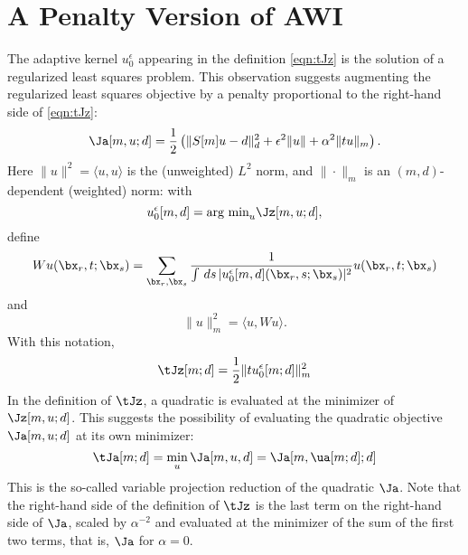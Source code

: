 \section{A Penalty Version of AWI}
The adaptive kernel $u_0^{\epsilon}$ appearing in the definition \ref{eqn:tJz} is the solution of a regularized least squares problem. This observation suggests augmenting the regularized least squares objective by a penalty proportional to the right-hand side of \ref{eqn:tJz}:
\begin{equation}
  \label{eqn:Ja}
  \Ja[m,u;d] = \frac{1}{2}\left(\|S[m]u-d\|_d^2 + \epsilon^2\|u\| + \alpha^2\|tu\|_m\right).
\end{equation}
Here $\|u\|^2 = \langle u, u \rangle$ is the (unweighted) $L^2$ norm, and $\|\cdot\|_m$ is an $(m,d)$-dependent (weighted) norm: with
\[
  u_0^{\epsilon}[m,d] = \mbox{arg min}_u \Jz[m,u;d],
\]
define
\[
  Wu (\bx_r,t;\bx_s) = \sum_{\bx_r,\bx_s}\frac{1}
  {\int\,ds\,|u_0^{\epsilon}[m,d](\bx_r,s;\bx_s)|^2}u(\bx_r,t;\bx_s)
\]
and
\begin{equation}
  \label{eqn:defmnorm}
  \|u\|^2_m = \langle u, W u \rangle.
\end{equation}
With this notation,
\[
  \tJz[m;d] = \frac{1}{2}\|tu^{\epsilon}_0[m;d]\|^2_m
\]
In the definition of $\tJz$, a quadratic is evaluated at the minimizer of $\Jz[m,u;d]$. This suggests the possibility of evaluating the quadratic objective $\Ja[m,u;d]$ at its own minimizer:
\begin{equation}
  \label{eqn:tJa}
  \tJa[m;d] = \min_u \Ja[m,u,d] = \Ja[m,\ua[m;d];d]
\end{equation}
This is the so-called variable projection reduction of the quadratic $\Ja$.
Note that the right-hand side of the definition of $\tJz$ is the last term on the right-hand side of $\Ja$, scaled by $\alpha^{-2}$ and evaluated at the minimizer of the sum of the first two terms, that is, $\Ja$ for $\alpha=0$.

